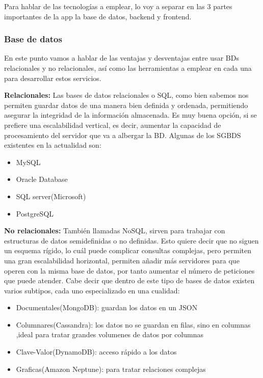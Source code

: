 Para hablar de las tecnologías a emplear, lo voy a separar en las 3 partes importantes de la app la base de datos, backend y frontend.

\subsubsection{Base de datos}

En este punto vamos a hablar de las ventajas y desventajas entre usar BDs relacionales y no relacionales, así como las herramientas a emplear en cada una para desarrollar estos servicios.

\textbf{Relacionales:} Las bases de datos relacionales o SQL, como bien sabemos nos permiten guardar datos de una manera bien definida y ordenada, permitiendo asegurar la integridad de la información almacenada. Es muy buena opción, si se prefiere una escalabilidad vertical, es decir, aumentar la capacidad de procesamiento del servidor que va a albergar la BD. Algunas de los SGBDS existentes en la actualidad son:

\begin{itemize}
	\item MySQL
	\item Oracle Database
	\item SQL server(Microsoft)
	\item PostgreSQL
\end{itemize}

\textbf{No relacionales:} También llamadas NoSQL, sirven para trabajar con estructuras de datos semidefinidas o no definidas. Esto quiere decir que no siguen un esquema rígido, lo cuál puede complicar consultas complejas, pero permiten una gran escalabilidad horizontal, permiten añadir más servidores para que operen con la misma base de datos, por tanto aumentar el número de peticiones que puede atender. Cabe decir que dentro de este tipo de bases de datos existen varios subtipos, cada uno especializado en una cualidad:

\begin{itemize}
	\item Documentales(MongoDB): guardan los datos en un JSON
	\item Columnares(Cassandra): los datos no se guardan en filas, sino en columnas ,ideal para tratar grandes volumenes de datos por columnas
	\item Clave-Valor(DynamoDB): acceso rápido a los datos
	\item Graficas(Amazon Neptune): para tratar relaciones complejas
\end{itemize}

